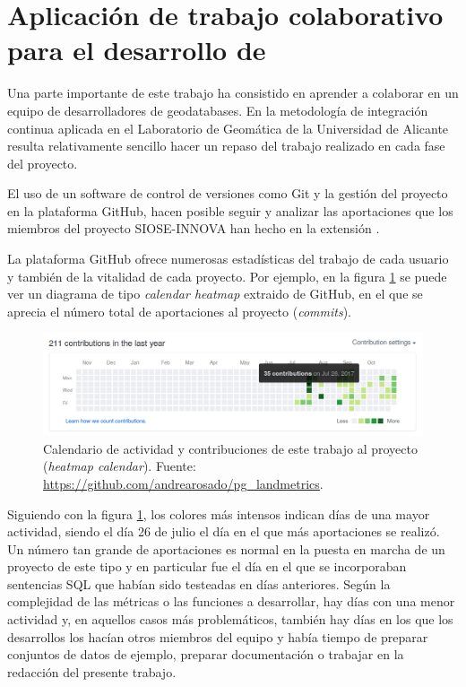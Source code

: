 \section{Aplicación de trabajo colaborativo para el desarrollo de \pgland{} \label{sec:pglandmetrics}}

Una parte importante de este trabajo ha consistido en aprender a colaborar en un equipo de desarrolladores de geodatabases. En la metodología de integración continua aplicada en el Laboratorio de Geomática de la Universidad de Alicante resulta relativamente sencillo hacer un repaso del trabajo realizado en cada fase del proyecto.

El uso de un software de control de versiones como Git y la gestión del proyecto en la plataforma GitHub, hacen posible seguir y analizar las aportaciones que los miembros del proyecto SIOSE-INNOVA han hecho en la extensión \pgland{}.

La plataforma GitHub ofrece numerosas estadísticas del trabajo de cada usuario y también de la vitalidad de cada proyecto. Por ejemplo, en la figura \ref{fig:contrib} se puede ver un diagrama de tipo \textit{calendar heatmap} extraido de GitHub, en el que se aprecia el número total de aportaciones al proyecto (\textit{commits}). 

\begin{figure}
\begin{center}
\includegraphics[width=\textwidth]{ResultadosyDiscusion/Figs/contributions.png}
\caption{Calendario de actividad y contribuciones de este trabajo al proyecto \pgland{} (\textit{heatmap calendar}). Fuente: \url{https://github.com/andrearosado/pg_landmetrics}. \label{fig:contrib}}
\end{center}
\end{figure}

Siguiendo con la figura \ref{fig:contrib}, los colores más intensos indican días de una mayor actividad, siendo el día 26 de julio el día en el que más aportaciones se realizó. Un número tan grande de aportaciones es normal en la puesta en marcha de un proyecto de este tipo y en particular fue el día en el que se incorporaban sentencias SQL que habían sido testeadas en días anteriores. Según la complejidad de las métricas o las funciones a desarrollar, hay días con una menor actividad y, en aquellos casos más problemáticos, también hay días en los que los desarrollos los hacían otros miembros del equipo y había tiempo de preparar conjuntos de datos de ejemplo, preparar documentación o trabajar en la redacción del presente trabajo.

